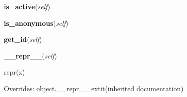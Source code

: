    \label{app:models:User:is_active}

    \vspace{0.5ex}

\hspace{.8\funcindent}\begin{boxedminipage}{\funcwidth}

    \raggedright \textbf{is\_active}(\textit{self})

\setlength{\parskip}{2ex}
\setlength{\parskip}{1ex}
    \end{boxedminipage}

    \label{app:models:User:is_anonymous}

    \vspace{0.5ex}

\hspace{.8\funcindent}\begin{boxedminipage}{\funcwidth}

    \raggedright \textbf{is\_anonymous}(\textit{self})

\setlength{\parskip}{2ex}
\setlength{\parskip}{1ex}
    \end{boxedminipage}

    \label{app:models:User:get_id}

    \vspace{0.5ex}

\hspace{.8\funcindent}\begin{boxedminipage}{\funcwidth}

    \raggedright \textbf{get\_id}(\textit{self})

\setlength{\parskip}{2ex}
\setlength{\parskip}{1ex}
    \end{boxedminipage}

    \vspace{0.5ex}

\hspace{.8\funcindent}\begin{boxedminipage}{\funcwidth}

    \raggedright \textbf{\_\_repr\_\_}(\textit{self})

\setlength{\parskip}{2ex}
    repr(x)

\setlength{\parskip}{1ex}
      Overrides: object.\_\_repr\_\_ 	extit{(inherited documentation)}

    \end{boxedminipage}

